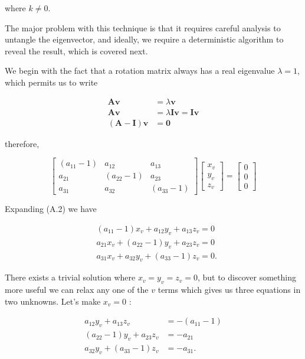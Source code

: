 where $k \neq 0$.

The major problem with this technique is that it requires careful analysis to untangle the eigenvector, and ideally, we require a deterministic algorithm to reveal the result, which is covered next.

We begin with the fact that a rotation matrix always has a real eigenvalue $\lambda=1$, which permits us to write

$$
\begin{aligned}
\mathbf{A} \mathbf{v} & =\lambda \mathbf{v} \\
\mathbf{A v} & =\lambda \mathbf{I} \mathbf{v}=\mathbf{I} \mathbf{v} \\
(\mathbf{A}-\mathbf{I}) \mathbf{v} & =\mathbf{0}
\end{aligned}
$$

therefore,

$$
\left[\begin{array}{ccc}
\left(a_{11}-1\right) & a_{12} & a_{13} \\
a_{21} & \left(a_{22}-1\right) & a_{23} \\
a_{31} & a_{32} & \left(a_{33}-1\right)
\end{array}\right]\left[\begin{array}{l}
x_{v} \\
y_{v} \\
z_{v}
\end{array}\right]=\left[\begin{array}{l}
0 \\
0 \\
0
\end{array}\right]
$$

Expanding (A.2) we have

$$
\begin{aligned}
& \left(a_{11}-1\right) x_{v}+a_{12} y_{v}+a_{13} z_{v}=0 \\
& a_{21} x_{v}+\left(a_{22}-1\right) y_{v}+a_{23} z_{v}=0 \\
& a_{31} x_{v}+a_{32} y_{v}+\left(a_{33}-1\right) z_{v}=0 .
\end{aligned}
$$

There exists a trivial solution where $x_{v}=y_{v}=z_{v}=0$, but to discover something more useful we can relax any one of the $v$ terms which gives us three equations in two unknowns. Let's make $x_{v}=0$ :

$$
\begin{aligned}
a_{12} y_{v}+a_{13} z_{v} & =-\left(a_{11}-1\right) \\
\left(a_{22}-1\right) y_{v}+a_{23} z_{v} & =-a_{21} \\
a_{32} y_{v}+\left(a_{33}-1\right) z_{v} & =-a_{31} .
\end{aligned}
$$

